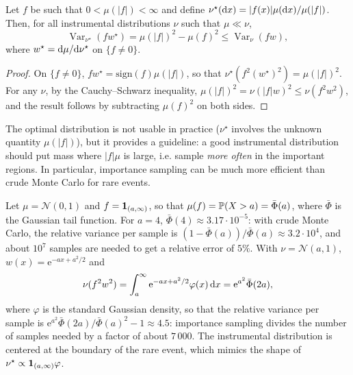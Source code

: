 \documentclass[english,graybox,envcountchap,envcountsame,sectrefs,shortlabels]{svmono}
\theoremstyle{style}
\newcommand{\rme}{\mathrm{e}}
\newcommand{\gauss}{\mathcal{N}}
\newcommand{\eqsp}{}
\begin{document}
\begin{proposition}
\label{prop:IS-optimal}
Let $f$ be such that $0<\mu(|f|)<\infty$ and define $\nu^\star(\mathrm{d} x) = |f(x)|\mu(\mathrm{d} x)/\mu(|f|)$. Then, for all instrumental distributions $\nu$ such that $\mu\ll\nu$,
$$
\operatorname{Var}_{\nu^\star}(fw^\star) = \mu(|f|)^2-\mu(f)^2\leq\operatorname{Var}_\nu(fw)\eqsp,
$$
where $w^\star = \mathrm{d}\mu/\mathrm{d}\nu^\star$ on $\{f\neq0\}$. 
\end{proposition}
\begin{proof}
On $\{f\neq 0\}$, $f w^\star = \mathrm{sign}(f)\mu(|f|)$, so that $\nu^\star(f^2(w^\star)^2) = \mu(|f|)^2$. For any $\nu$, by the Cauchy--Schwarz inequality, $\mu(|f|)^2 = \nu(|f|w)^2\leq\nu(f^2w^2)$, and the result follows by subtracting $\mu(f)^2$ on both sides.
\end{proof}
The optimal distribution is not usable in practice ($\nu^\star$ involves the unknown quantity $\mu(|f|)$), but it provides a guideline: a good instrumental distribution should put mass where $|f|\mu$ is large, i.e. sample \emph{more often} in the important regions. In particular, importance sampling can be much more efficient than crude Monte Carlo for rare events.

\begin{example}
\label{ex:IS-tail}
Let $\mu = \gauss(0,1)$ and $f = \mathbf{1}_{(a,\infty)}$, so that $\mu(f) = \mathbb{P}(X>a) = \bar\Phi(a)$, where $\bar\Phi$ is the Gaussian tail function. For $a=4$, $\bar\Phi(4)\approx3.17\cdot10^{-5}$: with crude Monte Carlo, the relative variance per sample is $(1-\bar\Phi(a))/\bar\Phi(a)\approx3.2\cdot10^4$, and about $10^7$ samples are needed to get a relative error of $5\%$. With $\nu = \gauss(a,1)$, $w(x) = \rme^{-ax+a^2/2}$ and
$$
\nu(f^2w^2) = \int_a^\infty \rme^{-ax+a^2/2}\varphi(x)\,\rmd x = \rme^{a^2}\bar\Phi(2a)\eqsp,
$$
where $\varphi$ is the standard Gaussian density, so that the relative variance per sample is $\rme^{a^2}\bar\Phi(2a)/\bar\Phi(a)^2-1\approx4.5$: importance sampling divides the number of samples needed by a factor of about $7\,000$. The instrumental distribution is centered at the boundary of the rare event, which mimics the shape of $\nu^\star\propto\mathbf{1}_{(a,\infty)}\varphi$.
\end{example}
\end{document}
